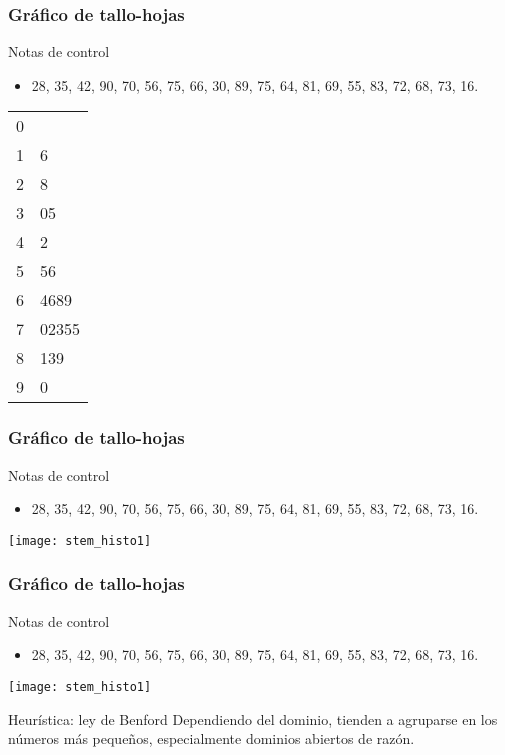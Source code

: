 \documentclass[table]{beamer}
\begin{document}
\begin{frame}
    \frametitle{Gráfico de tallo-hojas}
    \begin{block}{Notas de control}
        \begin{itemize}
            \item 28, 35, 42, 90, 70, 56, 75, 66, 30, 89, 75, 64, 81, 69, 55, 83, 72, 68, 73, 16.
        \end{itemize}
    \end{block}
    \begin{center}
        \begin{tabular}{c|l}
            0 & \\
            1 & 6 \\
            2 & 8 \\
            3 & 05 \\
            4 & 2 \\
            5 & 56 \\
            6 & 4689 \\
            7 & 02355 \\
            8 & 139 \\
            9 & 0 \\
        \end{tabular}
    \end{center}
\end{frame}

\begin{frame}
    \frametitle{Gráfico de tallo-hojas}
    \begin{block}{Notas de control}
        \begin{itemize}
            \item 28, 35, 42, 90, 70, 56, 75, 66, 30, 89, 75, 64, 81, 69, 55, 83, 72, 68, 73, 16.
        \end{itemize}
    \end{block}
    \begin{center}
        \texttt{[image: stem\_histo1]}
    \end{center}
\end{frame}

\begin{frame}
    \frametitle{Gráfico de tallo-hojas}
    \begin{block}{Notas de control}
        \begin{itemize}
            \item 28, 35, 42, 90, 70, 56, 75, 66, 30, 89, 75, 64, 81, 69, 55, 83, 72, 68, 73, 16.
        \end{itemize}
    \end{block}
    \begin{center}
        \texttt{[image: stem\_histo1]}
    \end{center}
    \begin{alertblock}{Heurística: ley de Benford}
        Dependiendo del dominio, tienden a agruparse en los números más pequeños, especialmente dominios abiertos de razón.
    \end{alertblock}
\end{frame}
\end{document}
